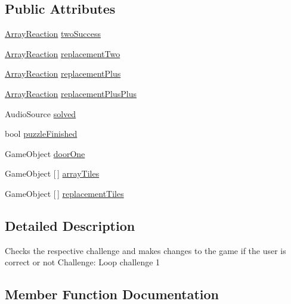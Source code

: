 \subsection*{Public Attributes}
\begin{DoxyCompactItemize}
\item 
\hyperlink{class_array_reaction}{Array\+Reaction} \hyperlink{class_completion_check_a565266c6464718da6c52d813c3b0ff32}{two\+Success}
\item 
\hyperlink{class_array_reaction}{Array\+Reaction} \hyperlink{class_completion_check_ab2384403c14606be2c726ba3fb4278f2}{replacement\+Two}
\item 
\hyperlink{class_array_reaction}{Array\+Reaction} \hyperlink{class_completion_check_ac92b5dad9a4e4aee625e20fce2fb4d0f}{replacement\+Plus}
\item 
\hyperlink{class_array_reaction}{Array\+Reaction} \hyperlink{class_completion_check_a90ecb0589046ab6ecc5a00bec9c266c0}{replacement\+Plus\+Plus}
\item 
Audio\+Source \hyperlink{class_completion_check_ab3aee64fe90f53bb4cff27b659072472}{solved}
\item 
bool \hyperlink{class_completion_check_a1b78317104756d1316af22e2bb555e4a}{puzzle\+Finished}
\item 
Game\+Object \hyperlink{class_completion_check_ae9a5f29e14ffbe992a16f08ebc2dc9f4}{door\+One}
\item 
Game\+Object \mbox{[}$\,$\mbox{]} \hyperlink{class_completion_check_ad53ac3b7c0d769b85b53bdb222172b7d}{array\+Tiles}
\item 
Game\+Object \mbox{[}$\,$\mbox{]} \hyperlink{class_completion_check_a2a5b3a10802d72c018ddc7f1d41ae60c}{replacement\+Tiles}
\end{DoxyCompactItemize}


\subsection{Detailed Description}
Checks the respective challenge and makes changes to the game if the user is correct or not Challenge\+: Loop challenge 1 

\subsection{Member Function Documentation}
\mbox{\label{class_completion_check_a54ea0b1dfecf4892ff9f43b0399c4dda}} 
